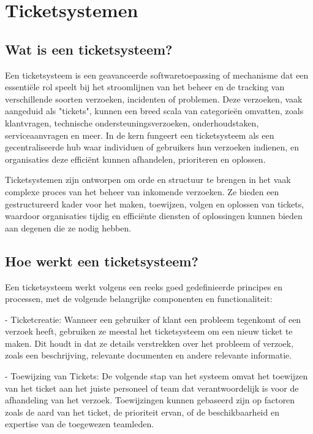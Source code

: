 
\section{Ticketsystemen}

\subsection{Wat is een ticketsysteem?}
 Een ticketsysteem is een geavanceerde softwaretoepassing of mechanisme dat een essentiële rol speelt bij het stroomlijnen van het beheer en de tracking van verschillende soorten verzoeken, incidenten of problemen. Deze verzoeken, vaak aangeduid als "tickets", kunnen een breed scala van categorieën omvatten, zoals klantvragen, technische ondersteuningsverzoeken, onderhoudstaken, serviceaanvragen en meer. In de kern fungeert een ticketsysteem als een gecentraliseerde hub waar individuen of gebruikers hun verzoeken indienen, en organisaties deze efficiënt kunnen afhandelen, prioriteren en oplossen.

Ticketsystemen zijn ontworpen om orde en structuur te brengen in het vaak complexe proces van het beheer van inkomende verzoeken. Ze bieden een gestructureerd kader voor het maken, toewijzen, volgen en oplossen van tickets, waardoor organisaties tijdig en efficiënte diensten of oplossingen kunnen bieden aan degenen die ze nodig hebben.

\subsection{Hoe werkt een ticketsysteem?}
 Een ticketsysteem werkt volgens een reeks goed gedefinieerde principes en processen, met de volgende belangrijke componenten en functionaliteit:

- Ticketcreatie: Wanneer een gebruiker of klant een probleem tegenkomt of een verzoek heeft, gebruiken ze meestal het ticketsysteem om een nieuw ticket te maken. Dit houdt in dat ze details verstrekken over het probleem of verzoek, zoals een beschrijving, relevante documenten en andere relevante informatie.

- Toewijzing van Tickets: De volgende stap van het systeem omvat het toewijzen van het ticket aan het juiste personeel of team dat verantwoordelijk is voor de afhandeling van het verzoek. Toewijzingen kunnen gebaseerd zijn op factoren zoals de aard van het ticket, de prioriteit ervan, of de beschikbaarheid en expertise van de toegewezen teamleden.

